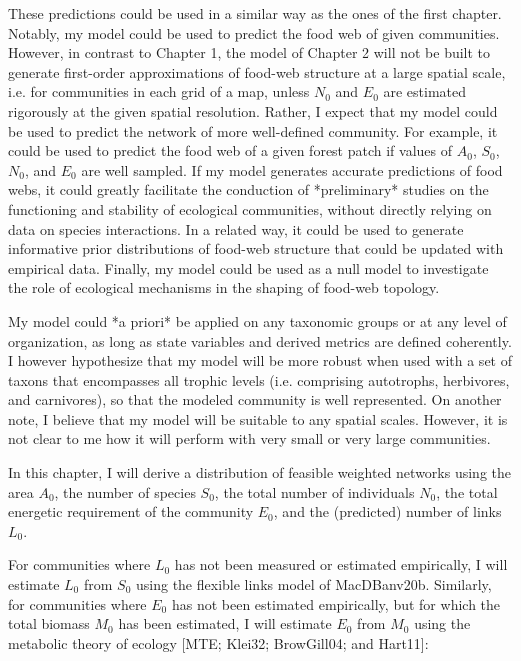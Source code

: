 These predictions could be used in a similar way as the ones of the first
chapter. Notably, my model could be used to predict the food web of given
communities. However, in contrast to Chapter 1, the model of Chapter 2 will not
be built to generate first-order approximations of food-web structure at a large
spatial scale, i.e. for communities in each grid of a map, unless $N_0$ and
$E_0$ are estimated rigorously at the given spatial resolution. Rather, I expect
that my model could be used to predict the network of more well-defined
community. For example, it could be used to predict the food web of a given
forest patch if values of $A_0$, $S_0$, $N_0$, and $E_0$ are well sampled. If my
model generates accurate predictions of food webs, it could greatly facilitate
the conduction of *preliminary* studies on the functioning and stability of
ecological communities, without directly relying on data on species
interactions. In a related way, it could be used to generate informative prior
distributions of food-web structure that could be updated with empirical data.
Finally, my model could be used as a null model to investigate the role of
ecological mechanisms in the shaping of food-web topology.

My model could *a priori* be applied on any taxonomic groups or at any level of
organization, as long as state variables and derived metrics are defined
coherently. I however hypothesize that my model will be more robust when used
with a set of taxons that encompasses all trophic levels (i.e. comprising
autotrophs, herbivores, and carnivores), so that the modeled community is well
represented. On another note, I believe that my model will be suitable to any
spatial scales. However, it is not clear to me how it will perform with very
small or very large communities.

In this chapter, I will derive a distribution of feasible weighted networks
using the area $A_0$, the number of species $S_0$, the total number of
individuals $N_0$, the total energetic requirement of the community $E_0$, and
the (predicted) number of links $L_0$. 

For communities where $L_0$ has not been measured or estimated empirically, I
will estimate $L_0$ from $S_0$ using the flexible links model of MacDBanv20b.
Similarly, for communities where $E_0$ has not been estimated empirically, but
for which the total biomass $M_0$ has been estimated, I will estimate $E_0$ from
$M_0$ using the metabolic theory of ecology [MTE; Klei32; BrowGill04; and
Hart11]:



